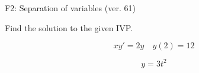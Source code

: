 \begin{exercise}
  \begin{exerciseTitle}F2: Separation of variables (ver. 61)\end{exerciseTitle}
  \begin{exerciseStatement}
    
Find the solution to the given IVP.

    
\[xy'= 2 y \hspace{1em} y( 2 ) = 12\]

  \end{exerciseStatement}
  \begin{exerciseAnswer}
    
\[y= 3 t^ 2\]

  \end{exerciseAnswer}
\end{exercise}